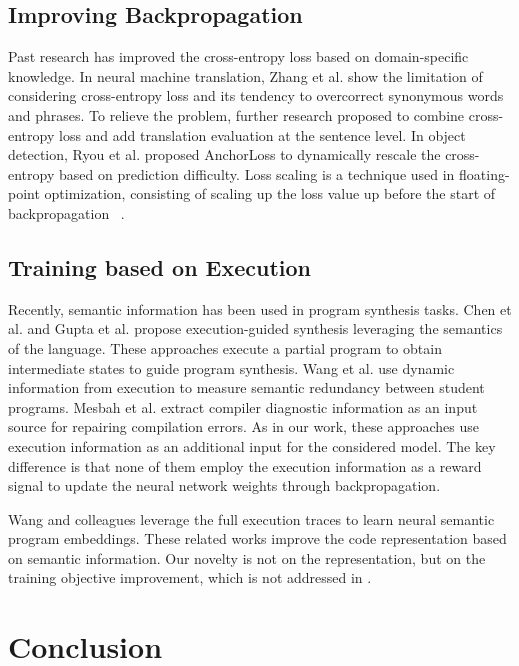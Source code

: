\subsection{Improving Backpropagation}
Past research has improved the cross-entropy loss based on domain-specific knowledge. 
In neural machine translation, 
Zhang et al. \cite{NMT-bridging} show the limitation of considering cross-entropy loss and its tendency to overcorrect synonymous words and phrases. To relieve the problem,  further research \cite{NMT-bridging,overcorrection} proposed to combine  cross-entropy loss and add translation evaluation at the sentence level.  
In object detection, Ryou et al. \cite{AnchorLoss} proposed AnchorLoss to dynamically rescale the cross-entropy based on prediction difficulty.
Loss scaling is a technique used in floating-point optimization, consisting of scaling up the loss value up before the start of backpropagation ~\cite{micikevicius2018mixed,lossscale}. 

\subsection{Training based on Execution}

Recently, semantic information has been used in program synthesis tasks. 
Chen et al. \cite{chen2018executionguided} and Gupta et al. \cite{sed-nips20} propose execution-guided synthesis leveraging the semantics of the language.  These approaches execute a partial program to obtain intermediate states to guide program synthesis.
Wang et al. \cite{wang-sar}  use dynamic information from execution to measure semantic redundancy between student programs. 
Mesbah et al. \cite{deepdelta} extract compiler diagnostic information as an input source for repairing compilation errors. 
As in our work, these approaches use execution information as an additional input for the considered model. The key difference is that none of them employ the execution information as a reward signal to update the neural network weights through backpropagation. 

Wang and colleagues \cite{wang2018dynamic,embed-ke-PLDI20} leverage the full execution traces to learn neural semantic program embeddings. These related works improve the code representation based on semantic information.
Our novelty is not on the representation, but on the training objective improvement, which is not addressed in \cite{wang2018dynamic,embed-ke-PLDI20}.

\section{Conclusion}

